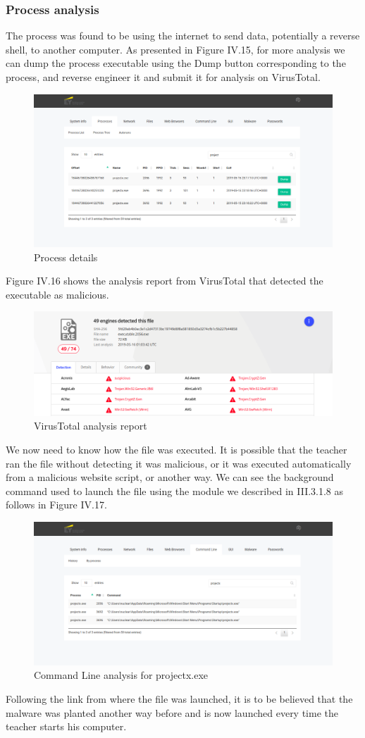 \subsubsection{Process analysis}
The process was found to be using the internet to send data, potentially a reverse shell, to another computer. As presented in Figure IV.15, for more analysis we can dump the process executable using the Dump button corresponding to the process, and reverse engineer it and submit it for analysis on VirusTotal.
\begin{figure}[H]
\centering
\includegraphics[width=0.9\columnwidth]{Figures/15.png}
\caption{Process details}
\end{figure}
Figure IV.16 shows the analysis report from VirusTotal that detected the executable as malicious.
\begin{figure}[H]
\centering
\includegraphics[width=0.9\columnwidth]{Figures/16.png}
\caption{VirusTotal analysis report}
\end{figure}
We now need to know how the file was executed. It is possible that the teacher ran the file without detecting it was malicious, or it was executed automatically from a malicious website script, or another way. We can see the background command used to launch the file using the module we described in III.3.1.8 as follows in Figure IV.17.
\begin{figure}[H]
\centering
\includegraphics[width=0.9\columnwidth]{Figures/17.png}
\caption{Command Line analysis for projectx.exe}
\end{figure}
Following the link from where the file was launched, it is to be believed that the malware was planted another way before and is now launched every time the teacher starts his computer.
